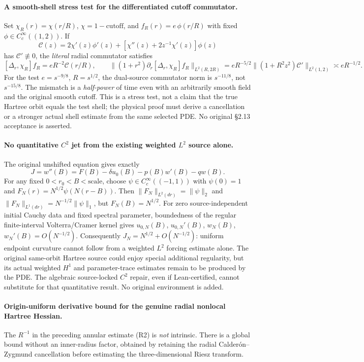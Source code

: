 \documentclass[11pt]{amsart}
\begin{document}
\paragraph{A smooth-shell stress test for the differentiated cutoff commutator.}
Set \(\chi_R(r)=\chi(r/R)\), \(\chi=1-\mathrm{cutoff}\),
and \(f_R(r)=e\,\phi(r/R)\) with fixed
\(\phi\in C_c^\infty((1,2))\). If
\[
 \mathscr C(z)=2\chi'(z)\phi'(z)
   +[\chi''(z)+2z^{-1}\chi'(z)]\phi(z)
\]
has \(\mathscr C'\not\equiv0\), the \emph{literal}
radial commutator satisfies
\[
 [\Delta_r,\chi_R]f_R=eR^{-2}\mathscr C(r/R),
 \qquad
 \|(1+r^2)\partial_r[\Delta_r,\chi_R]f_R\|_{L^2(R,2R)}
 =eR^{-5/2}\|(1+R^2z^2)\mathscr C'\|_{L^2(1,2)}
 \asymp eR^{-1/2}.
\]
For the test \(e=s^{-9/8}\), \(R=s^{1/2}\),
the dual-source commutator norm is \(s^{-11/8}\),
not \(s^{-15/8}\). The mismatch is a
\emph{half-power} of time even with an
arbitrarily smooth field and the original
smooth cutoff. This is a stress test, not a
claim that the true Hartree orbit equals the
test shell; the physical proof must derive
a cancellation or a stronger actual shell
estimate from the same selected PDE.
No original §2.13 acceptance is asserted.


\paragraph{No quantitative \(C^2\) jet from the existing weighted \(L^2\) source alone.}
The original unshifted equation gives exactly
\[
 J=w''(B)=F(B)-\delta u_0(B)-p(B)w'(B)-q w(B).
\]
For any fixed \(0<r_0<B<\mathrm{scale}\), choose
\(\psi\in C_c^\infty((-1,1))\) with \(\psi(0)=1\)
and \(F_N(r)=N^{1/2}\psi(N(r-B))\).
Then \(\|F_N\|_{L^2(dr)}=\|\psi\|_2\) and
\(\|F_N\|_{L^1(dr)}=N^{-1/2}\|\psi\|_1\), but
\(F_N(B)=N^{1/2}\).
For zero source-independent initial Cauchy data
and fixed spectral parameter, boundedness of the
regular finite-interval Volterra/Cramer kernel
gives \(u_{0,N}(B)\), \(u_{0,N}'(B)\),
\(w_N(B)\), \(w_N'(B)=O(N^{-1/2})\).
Consequently \(J_N=N^{1/2}+O(N^{-1/2})\):
uniform endpoint curvature cannot follow
from a weighted \(L^2\) forcing estimate alone.
The original same-orbit Hartree source could enjoy
special additional regularity, but its actual
weighted \(H^1\) and parameter-trace estimates
remain to be produced by the PDE.
The algebraic source-locked \(C^2\) repair,
even if Lean-certified, cannot substitute
for that quantitative result.
No original environment is added.


\paragraph{Origin-uniform derivative bound for the genuine radial
nonlocal Hartree Hessian.}
The \(R^{-1}\) in the preceding annular estimate (R2) is
\emph{not} intrinsic. There is a global bound without an
inner-radius factor, obtained by retaining the radial
Calder\'on--Zygmund cancellation before estimating the
three-dimensional Riesz transform.
\end{document}
